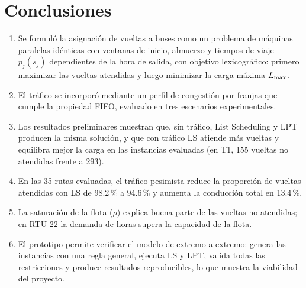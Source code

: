 \section{Conclusiones}\label{sec:conclusiones}
\begin{enumerate}
  \item Se formuló la asignación de vueltas a buses como un problema de máquinas paralelas idénticas con ventanas de inicio, almuerzo y tiempos de viaje $p_j(s_j)$ dependientes de la hora de salida, con objetivo lexicográfico: primero maximizar las vueltas atendidas y luego minimizar la carga máxima $L_{\max}$.
  \item El tráfico se incorporó mediante un perfil de congestión por franjas que cumple la propiedad FIFO, evaluado en tres escenarios experimentales.
  \item Los resultados preliminares muestran que, sin tráfico, List Scheduling y LPT producen la misma solución, y que con tráfico LS atiende más vueltas y equilibra mejor la carga en las instancias evaluadas (en T1, 155 vueltas no atendidas frente a 293).
  \item En las 35 rutas evaluadas, el tráfico pesimista reduce la proporción de vueltas atendidas con LS de 98.2\,\% a 94.6\,\% y aumenta la conducción total en 13.4\,\%.
  \item La saturación de la flota ($\rho$) explica buena parte de las vueltas no atendidas; en RTU-22 la demanda de horas supera la capacidad de la flota.
  \item El prototipo permite verificar el modelo de extremo a extremo: genera las instancias con una regla general, ejecuta LS y LPT, valida todas las restricciones y produce resultados reproducibles, lo que muestra la viabilidad del proyecto.
\end{enumerate}
